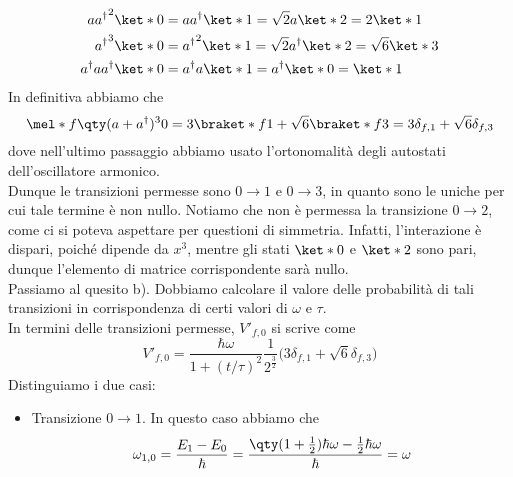\begin{soluzione}
   \begin{equation*}
      \begin{split}
         a{a^{\dag}}^2 \ket*{0}
         &
         =a a^{\dag} \ket*{1}
         =\sqrt{2} a \ket*{2}
         =2 \ket*{1}
         \\
         {a^{\dag}}^3 \ket*{0}
         &
         ={a^{\dag}}^2 \ket*{1}
         =\sqrt{2} a^{\dag} \ket*{2}
         =\sqrt{6} \ket*{3}
         \\
         a^{\dag} a a^{\dag} \ket*{0}
         &
         =a^{\dag} a \ket*{1}
         =a^{\dag} \ket*{0}
         =\ket*{1}
         \\
      \end{split}
   \end{equation*}
   In definitiva abbiamo che
   \begin{equation*}
      \mel*{f}{\qty( a + a^{\dag} )^3}{0}
      =3\braket*{f}{1} + \sqrt{6} \braket*{f}{3}
      =3 \delta_{f,1} + \sqrt{6} \delta_{f,3}
   \end{equation*}
   dove nell'ultimo passaggio abbiamo usato l'ortonomalità degli autostati dell'oscillatore armonico.\\
   Dunque le transizioni permesse sono $0 \to 1$ e $0 \to 3$, in quanto sono le uniche per cui tale termine è non nullo. Notiamo che non è permessa la transizione $0 \to 2$, come ci si poteva aspettare per questioni di simmetria. Infatti, l'interazione è dispari, poiché dipende da $x^3$, mentre gli stati $\ket*{0}$ e $\ket*{2}$ sono pari, dunque l'elemento di matrice corrispondente sarà nullo.\\
   Passiamo al quesito b). Dobbiamo calcolare il valore delle probabilità di tali transizioni in corrispondenza di certi valori di $\omega$ e $\tau$.\\
   In termini delle transizioni permesse, $V'_{f,0}$ si scrive come
   \begin{equation*}
      V'_{f,0}
      =\frac{\hbar\omega}{1 + (t/\tau)^2} \frac{1}{2^{\frac{3}{2}}} \bigl( 3 \delta_{f,1} + \sqrt{6} \delta_{f,3} \bigr)
   \end{equation*}
   Distinguiamo i due casi:
   \begin{itemize}[leftmargin=0.5cm]
      \item Transizione $0 \to 1$. In questo caso abbiamo che
      \begin{equation*}
         \omega_{1,0}
         =\frac{E_1 - E_0}{\hbar}
         =\frac{\qty( 1 + \frac{1}{2} ) \hbar\omega - \frac{1}{2} \hbar\omega }{\hbar}
         =\omega
      \end{equation*}

\end{itemize}
\end{soluzione}
